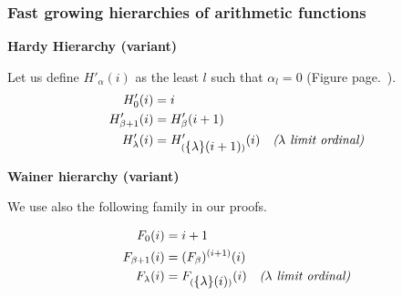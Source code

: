\documentclass[10pt, fleqn]{beamer}
\begin{document}
\begin{frame}
  \frametitle{Fast growing hierarchies of arithmetic functions}




\begin{block}{}
 
  {\small
\textbf{Hardy Hierarchy (variant)}
    
 Let us define \textcolor{mathcolor}{$H'_\alpha(i)$} as the least $l$ such that \textcolor{mathcolor}{$\alpha_l=0$} (Figure page.~\pageref{fig:accessibility}). 
 {\color{mathcolor}
\begin{align}
  H'_0(i) & = i\\
  H'_{\beta+1}(i) &=H'_\beta(i+1) \\
  H'_\lambda(i) &= H'_{(\mbox{$\{\lambda\}(i+1)$})}(i)  \quad\textit{($\lambda$ limit ordinal)} 
\end{align}}
 

\vspace{4pt}

\textbf{Wainer hierarchy (variant)}


We use also the following family in our proofs.

{\color{mathcolor}
\begin{align}
F_0(i)& =i+1\\
F_{\beta+1}(i)&= (F_\beta)^{(i+1)}(i)\\
F_\lambda(i) &= F_{(\mbox{$\{\lambda\}(i)$})} (i) \quad \textit{($\lambda$ limit ordinal)}
\end{align}}}
\end{block}
\end{frame}



 

 
\end{document}
